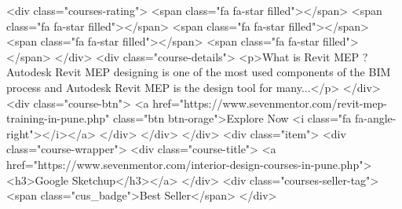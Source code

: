 {<div class="courses-rating">
<span class="fa fa-star filled"></span>
<span class="fa fa-star filled"></span>
<span class="fa fa-star filled"></span>
<span class="fa fa-star filled"></span>
<span class="fa fa-star filled"></span>
</div>
<div class="course-details">
<p>What is Revit MEP ? Autodesk Revit MEP designing is one of the most used components of the BIM process and Autodesk Revit MEP is the design tool for many...</p>
</div>
<div class="course-btn">
<a href="https://www.sevenmentor.com/revit-mep-training-in-pune.php" class="btn btn-orage">Explore Now <i class="fa fa-angle-right"></i></a>
</div>
</div>
</div>
<div class="item">
<div class="course-wrapper">
<div class="course-title">
<a href="https://www.sevenmentor.com/interior-design-courses-in-pune.php"><h3>Google Sketchup</h3></a>
</div>
<div class="courses-seller-tag">
<span class="cus_badge">Best Seller</span>
</div>

}
